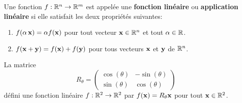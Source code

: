 {\begin{defn}
Une fonction $f:\mathbb{R}^n\rightarrow \mathbb{R}^m$ est appelée une
{\bfseries fonction linéaire} ou
{\bfseries application linéaire} si
elle satisfait les deux propriétés suivantes:
\begin{enumerate}
\item $f(\alpha\,\mathbf{x}) = \alpha f(\mathbf{x})$ pour tout vecteur
$\mathbf{x} \in \mathbb{R}^n$ et tout $\alpha \in \mathbb{R}$.
\item $f(\mathbf{x}+\mathbf{y}) = f(\mathbf{x}) + f(\mathbf{y})$ pour tous vecteurs
$\mathbf{x}$ et $\mathbf{y}$ de $\mathbb{R}^n$. 
\end{enumerate}
\label{funct_lin_def} 
\end{defn}

\begin{egg}
La matrice
\[
R_\theta =
\begin{pmatrix}
\cos(\theta) & -\sin(\theta) \\ \sin(\theta) & \cos(\theta)
\end{pmatrix}
\]
défini une fonction linéaire $f:\mathbb{R}^2\rightarrow \mathbb{R}^2$ par
$f(\mathbf{x})=R_\theta \mathbf{x}$ pour tout $\mathbf{x}\in \mathbb{R}^2$.


\end{egg}}
